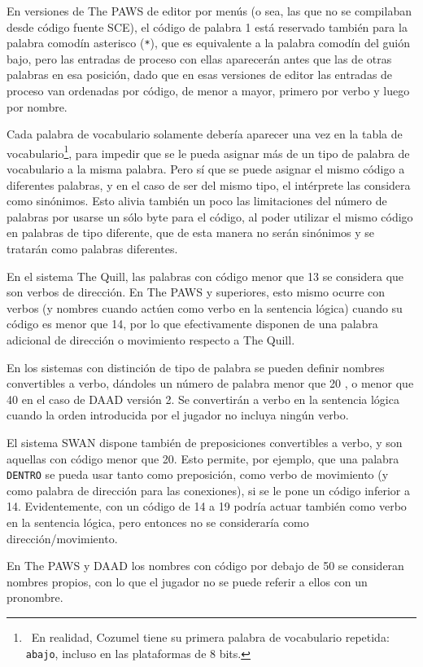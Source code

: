 \documentclass[11pt, a5paper]{article}
\newcommand{\quill}{\textsf{The Quill}\xspace}
\newcommand{\paw}{\textsf{The PAWS}\xspace}
\newcommand{\swan}{\textsf{SWAN}\xspace}
\newcommand{\daad}{\textsf{DAAD}\xspace}
\begin{document}
En versiones de \paw de editor por menús (o sea, las que no se compilaban desde código fuente SCE), el código de palabra 1 está reservado también para la palabra comodín asterisco (\texttt{*}), que es equivalente a la palabra comodín del guión bajo, pero las entradas de proceso con ellas aparecerán antes que las de otras palabras en esa posición, dado que en esas versiones de editor las entradas de proceso van ordenadas por código, de menor a mayor, primero por verbo y luego por nombre.

Cada palabra de vocabulario solamente debería aparecer una vez en la tabla de vocabulario\footnote{\ En realidad, Cozumel tiene su primera palabra de vocabulario repetida: \texttt{abajo}, incluso en las plataformas de 8 bits.}, para impedir que se le pueda asignar más de un tipo de palabra de vocabulario a la misma palabra. Pero sí que se puede asignar el mismo código a diferentes palabras, y en el caso de ser del mismo tipo, el intérprete las considera como sinónimos. Esto alivia también un poco las limitaciones del número de palabras por usarse un sólo byte para el código, al poder utilizar el mismo código en palabras de tipo diferente, que de esta manera no serán sinónimos y se tratarán como palabras diferentes.

En el sistema \quill, las palabras con código menor que 13 se considera que son verbos de dirección. En \paw y superiores, esto mismo ocurre con verbos (y nombres cuando actúen como verbo en la sentencia lógica) cuando su código es menor que 14, por lo que efectivamente disponen de una palabra adicional de dirección o movimiento respecto a \quill.

En los sistemas con distinción de tipo de palabra se pueden definir nombres convertibles a verbo, dándoles un número de palabra menor que 20 \cite[sección VOC]{PawsPC}, o menor que 40 en el caso de \daad versión 2. Se convertirán a verbo en la sentencia lógica cuando la orden introducida por el jugador no incluya ningún verbo.

El sistema \swan dispone también de preposiciones convertibles a verbo, y son aquellas con código menor que 20. Esto permite, por ejemplo, que una palabra \texttt{DENTRO} se pueda usar tanto como preposición, como verbo de movimiento (y como palabra de dirección para las conexiones), si se le pone un código inferior a 14. Evidentemente, con un código de 14 a 19 podría actuar también como verbo en la sentencia lógica, pero entonces no se consideraría como dirección/movimiento.

En \paw y \daad los nombres con código por debajo de 50 se consideran nombres propios, con lo que el jugador no se puede referir a ellos con un pronombre.
\end{document}
